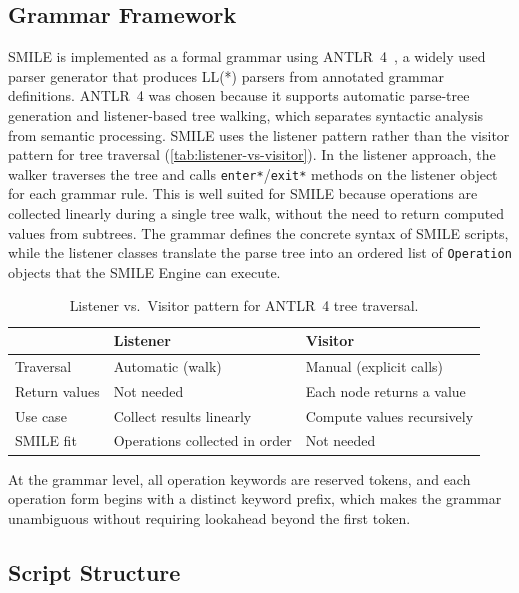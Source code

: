 \subsection{Grammar Framework}\label{subsec:grammar-framework}

  SMILE  is implemented as a formal grammar using ANTLR~4~\cite{parr2013definitive}, a widely used parser generator that produces LL(*) parsers from annotated grammar
  definitions. ANTLR~4 was chosen because it supports automatic parse-tree generation and listener-based tree walking, which separates syntactic
  analysis from semantic processing.
SMILE  uses the listener pattern rather than the visitor pattern for tree traversal (\autoref{tab:listener-vs-visitor}). In the listener approach,
  the walker traverses the tree and calls \texttt{enter*}/\texttt{exit*} methods on the listener object for each grammar rule. This is well suited for
  SMILE  because operations are collected linearly during a single tree walk, without the need to return computed values from subtrees. The grammar
  defines the concrete syntax of SMILE  scripts, while the listener classes translate the parse tree into an ordered list of \texttt{Operation}
  objects that the SMILE  Engine can execute.

  \begin{table}[htbp]
  \centering
  \caption{Listener vs.\ Visitor pattern for ANTLR~4 tree traversal.}
  \label{tab:listener-vs-visitor}
  \small
  \begin{tabular}{lll}
  \toprule
  & \textbf{Listener} & \textbf{Visitor} \\
  \midrule
  Traversal & Automatic (walk) & Manual (explicit calls) \\
  Return values & Not needed & Each node returns a value \\
  Use case & Collect results linearly & Compute values recursively \\
  SMILE  fit & Operations collected in order & Not needed \\
  \bottomrule
  \end{tabular}
  \end{table}

  At the grammar level, all operation keywords are reserved tokens, and each operation form begins with a distinct keyword prefix, which makes the
  grammar unambiguous without requiring lookahead beyond the first token.

\subsection{Script Structure}\label{subsec:script-structure}

